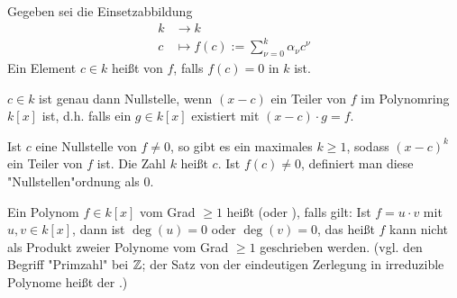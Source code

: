 \begin{defn}[Nullstelle]
	Gegeben sei die Einsetzabbildung
	\begin{equation}
	\begin{aligned}
		k &\longrightarrow k \\
		c &\longmapsto f(c) := \sum_{\nu = 0}^{k} \alpha_\nu c^\nu
	\end{aligned}
	\end{equation}
	Ein Element $c \in k$ heißt  von $f$, falls $f(c) = 0$ in $k$ ist.
\end{defn}

\begin{bem}
	$c \in k$ ist genau dann Nullstelle, wenn $(x-c)$ ein Teiler von $f$ im Polynomring $k[x]$ ist, d.h. falls ein $g \in k[x]$ existiert mit $(x-c) \cdot g = f$.
\end{bem}

\begin{defn}
	Ist $c$ eine Nullstelle von $f \neq 0$, so gibt es ein maximales $k \geq 1$, sodass $(x-c)^k$ ein Teiler von $f$ ist. 
	Die Zahl $k$ heißt  $c$. 
	Ist $f(c) \neq 0$, definiert man diese "Nullstellen"ordnung als $0$. 
\end{defn}

\begin{defn}
	Ein Polynom $f \in k[x]$ vom Grad $\geq 1$ heißt  (oder ), falls gilt: Ist $f = u \cdot v$ mit $u,v \in k[x]$, dann ist $\deg(u) = 0$ oder $\deg(v) = 0$, das heißt $f$ kann nicht als Produkt zweier Polynome vom Grad $\geq 1$ geschrieben werden. 
	(vgl. den Begriff "Primzahl" bei $\mathbb{Z}$; der Satz von der eindeutigen Zerlegung in irreduzible Polynome heißt der .)
\end{defn}

